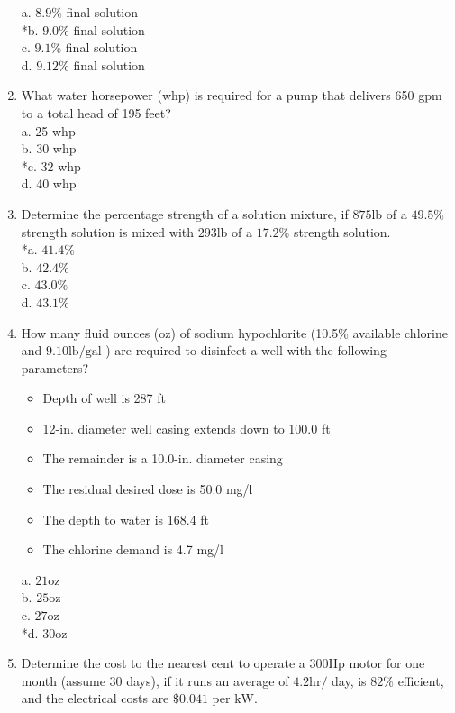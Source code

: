 \begin{enumerate}
a. $8.9 \%$ final solution\\
*b. $9.0 \%$ final solution\\
c. $9.1 \%$ final solution\\
d. $9.12 \%$ final solution\\
\item What water horsepower (whp) is required for a pump that delivers 650 gpm to a total head of 195 feet?\\
a. 25 whp\\
b. 30 whp\\
*c. 32 whp\\
d. 40 whp\\
\item Determine the percentage strength of a solution mixture, if $875 \mathrm{lb}$ of a $49.5 \%$ strength solution is mixed with $293 \mathrm{lb}$ of a $17.2 \%$ strength solution.\\
*a. $41.4 \%$\\
b. $42.4 \%$\\
c. $43.0 \%$\\
d. $43.1 \%$ \\
\item How many fluid ounces (oz) of sodium hypochlorite (10.5\% available chlorine and $9.10 \mathrm{lb} / \mathrm{gal}$ ) are required to disinfect a well with the following parameters?\\
\begin{itemize}
\item Depth of well is 287 ft\\
\item 12-in. diameter well casing extends down to 100.0 ft\\
\item The remainder is a 10.0-in. diameter casing\\
\item The residual desired dose is 50.0 mg/l\\
\item The depth to water is 168.4 ft\\
\item The chlorine demand is 4.7 mg/l\\
  \end{itemize}
a. $21 \mathrm{oz}$\\
b. $25 \mathrm{oz}$\\
c. $27 \mathrm{oz}$\\
*d. $30 \mathrm{oz}$\\
\item Determine the cost to the nearest cent to operate a $300 \mathrm{Hp}$ motor for one month (assume 30 days), if it runs an average of $4.2 \mathrm{hr} /$ day, is $82 \%$ efficient, and the electrical costs are $\$ 0.041$ per $\mathrm{kW}$.\\

\end{enumerate}
